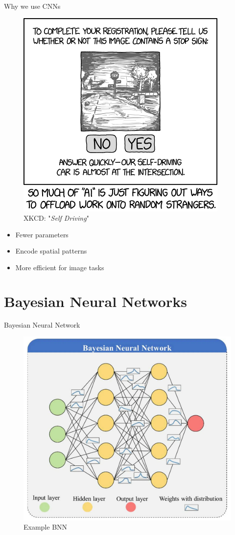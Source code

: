 \documentclass{beamer}
\begin{document}
\begin{frame}{Why we use CNNs}
	\begin{multicols}{2}
		\begin{figure}
			\includegraphics[width=.45\textwidth]{../Images/xkcd_self_driving.png}
			\caption{XKCD: "\textit{Self Driving}" \cite{xkcd-self-driving}}
		\end{figure}
		
		\columnbreak
		
		\null \vfill
		\begin{itemize}
			\item Fewer parameters
			\item Encode spatial patterns
			\item More efficient for image tasks
		\end{itemize}
		\vfill \null
	\end{multicols}
\end{frame}

\section{Bayesian Neural Networks}

\begin{frame}{Bayesian Neural Network}
	\begin{figure}
		\includegraphics[width=.55\textwidth]{../Images/example_bnn.png}
		\caption{Example BNN  \cite{FleszarBNN}}
	\end{figure}
\end{frame}
\end{document}
